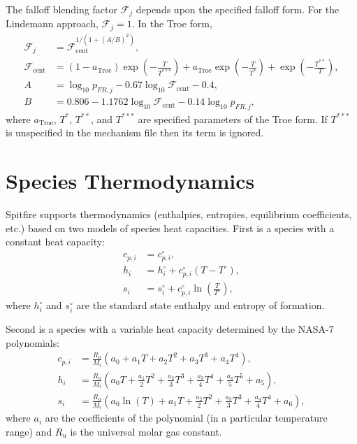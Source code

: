 \documentclass[letterpaper,10pt,english]{sphinxmanual}
\begin{document}
The falloff blending factor \(\mathcal{F}_j\) depends upon the specified falloff form.
For the Lindemann approach, \(\mathcal{F}_j = 1\).
In the Troe form,
\begin{equation}\label{equation:combustion:combustion:12}
\begin{split}\mathcal{F}_j &= \mathcal{F}_{\text{cent}}^{1/(1+(A/B)^2)}, \\
\mathcal{F}_{\text{cent}} &= (1-a_{\text{Troe}})\exp\left(-\frac{T}{T^{***}}\right) + a_{\text{Troe}}\exp\left(-\frac{T}{T^{*}}\right) + \exp\left(-\frac{T^{**}}{T}\right), \\
A &= \log_{10}p_{FR,j} - 0.67\log_{10}\mathcal{F}_{\text{cent}} - 0.4, \\
B &= 0.806 - 1.1762\log_{10}\mathcal{F}_{\text{cent}} - 0.14\log_{10}p_{FR,j},\end{split}
\end{equation}
where \(a_{\text{Troe}}\), \(T^{*}\), \(T^{**}\), and \(T^{***}\) are specified parameters of the Troe form.
If \(T^{***}\) is unspecified in the mechanism file then its term is ignored.


\section{Species Thermodynamics}
\label{\detokenize{combustion:species-thermodynamics}}
Spitfire supports thermodynamics (enthalpies, entropies, equilibrium coefficients, etc.) based on two models of
species heat capacities.
First is a species with a constant heat capacity:
\begin{equation}\label{equation:combustion:combustion:13}
\begin{split}c_{p,i} &= c_{p,i}^\circ, \\
h_i &= h_i^\circ + c_{p,i}^\circ(T - T^\circ), \\
s_i &= s_i^\circ + c_{p,i}^\circ\ln\left(\frac{T}{T^\circ}\right),\end{split}
\end{equation}
where \(h_i^\circ\) and \(s_i^\circ\) are the standard state enthalpy and entropy of formation.

Second is a species with a variable heat capacity determined by the NASA-7 polynomials:
\begin{equation}\label{equation:combustion:combustion:14}
\begin{split}c_{p,i} &= \frac{R_u}{M_i}\left(a_0 + a_1T + a_2T^2 + a_3T^3 + a_4T^4\right), \\
h_i &= \frac{R_u}{M_i}\left(a_0T + \frac{a_1}{2}T^2 + \frac{a_2}{3}T^3 + \frac{a_3}{4}T^4 + \frac{a_4}{5}T^5 + a_5\right), \\
s_i &= \frac{R_u}{M_i}\left(a_0\ln(T) + a_1T + \frac{a_2}{2}T^2 + \frac{a_3}{3}T^3 + \frac{a_4}{4}T^4 + a_6\right),\end{split}
\end{equation}
where \(a_i\) are the coefficients of the polynomial (in a particular temperature range) and \(R_u\) is the universal molar gas constant.
\end{document}

